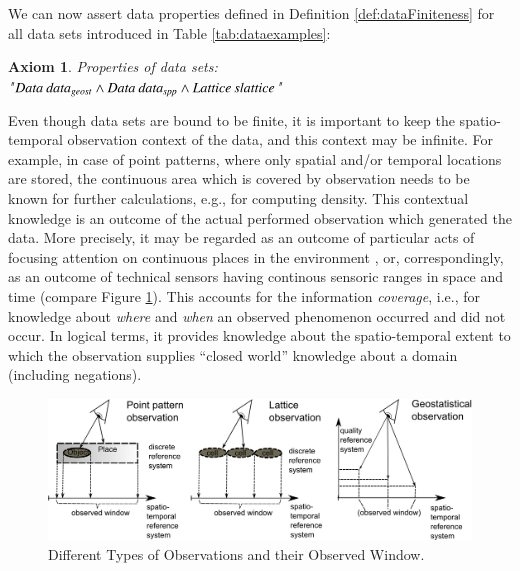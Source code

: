 \documentclass[final,authoryear,1p,times]{elsarticle}
\newtheorem{Axiom}{Axiom}
\begin{document}
We can now assert data properties defined in Definition \ref{def:dataFiniteness} for all data sets introduced in Table \ref{tab:dataexamples}:

\begin{Axiom} Properties of data sets:\\
"${\it Data \: data_{geost} \wedge Data \: data_{spp} \wedge Lattice \: slattice}$"
\label{ax:dataGeost}
\end{Axiom}

Even though data sets are bound to be finite, it is important to keep the spatio-temporal observation context of the data, and this context may be infinite. For example, in case of point patterns, where only spatial and/or temporal locations are stored, the continuous area which is covered by observation needs to be known for further calculations, e.g., for computing density. This contextual knowledge is an outcome of the actual performed observation which generated the data. More precisely, it may be regarded as an outcome of particular acts of focusing attention on continuous places in  the environment \citep{Scheider.2011c}, or, correspondingly, as an outcome of technical sensors having continous sensoric ranges in space and time (compare Figure \ref{fig:observationwindow}). This accounts for the information \textit{coverage}, i.e., for knowledge about \textit{where} and \textit{when} an observed phenomenon occurred and did not occur.  In logical terms, it provides knowledge about the spatio-temporal extent to which the observation supplies ``closed world'' knowledge about a domain (including negations).

\begin{figure}[ht]
	\centering
		\includegraphics[width=1\textwidth]{observationwindow.png}
	\caption{Different Types of Observations and their Observed Window.}
	\label{fig:observationwindow}
\end{figure}
\end{document}
